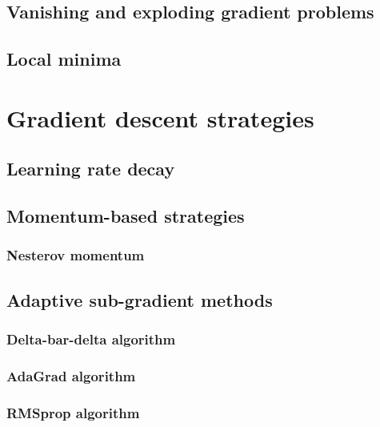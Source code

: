 \subsection{Vanishing and exploding gradient problems}

\subsection{Local minima}


\section{Gradient descent strategies}

\subsection{Learning rate decay}


\subsection{Momentum-based strategies}

\subsubsection{Nesterov momentum}


\subsection{Adaptive sub-gradient methods}

\subsubsection{Delta-bar-delta algorithm}

\subsubsection{AdaGrad algorithm}

\subsubsection{RMSprop algorithm}

